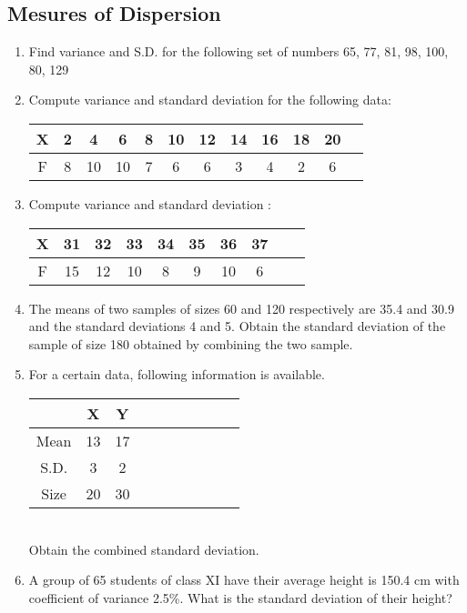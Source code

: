 \documentclass[17pt]{extarticle}
\begin{document}
\begin{multicols}{2}
\section{Mesures of Dispersion}
\noindent
\begin{enumerate}
\item Find variance and S.D. for the following set of numbers 65, 77, 81, 98, 100, 80, 129

\item Compute variance and standard deviation for the following data:

\begin{tabular}{|c|*{11}{c|}}
\hline X & 2 & 4 & 6 & 8 & 10 & 12 & 14 & 16 & 18 & 20  \\
\hline F & 8 & 10 & 10 & 7 & 6 & 6 & 3 & 4 & 2 & 6 \\
\hline
\end{tabular}

\item Compute variance and standard deviation :

\begin{tabular}{|c|*{9}{c|}}
\hline X & 31 & 32 & 33 & 34 & 35 & 36 & 37 \\
\hline F & 15 & 12 & 10 & 8 & 9 & 10 & 6 \\
\hline
\end{tabular}

\item The means of two samples of sizes 60 and 120 respectively are 35.4 and 30.9 and the standard deviations 4 and 5. Obtain the standard deviation of the sample of size 180 obtained by combining the two sample.


\item For a certain data, following information is available.

\begin{tabular}{|c|*{9}{c|}}
\hline  & X & Y  \\
\hline Mean & 13 & 17  \\
\hline S.D. & 3 & 2  \\
\hline Size & 20 & 30  \\
\hline
\end{tabular}\\
\vspace{1mm}
Obtain the combined standard deviation.

\item A group of 65 students of class XI have their average height is 150.4 cm with coefficient of variance 2.5\%. What is the standard deviation of their height?


\end{enumerate}
\end{multicols}
\end{document}
